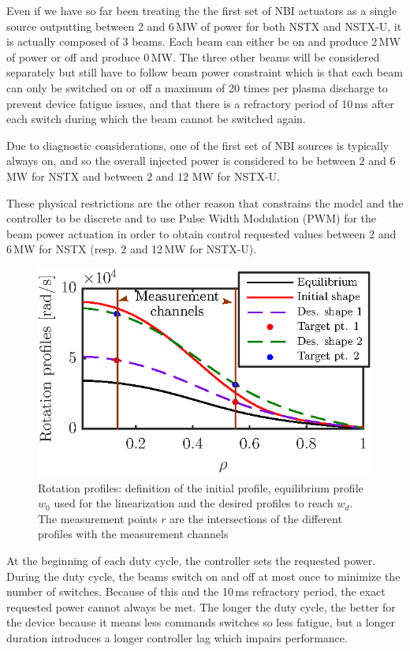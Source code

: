 \documentclass[12pt,lot, lof]{puthesis}
\begin{document}
Even if we have so far been treating the the first set of NBI actuators as a single source outputting between 2 and 6\,MW of power for both NSTX and NSTX-U, it is actually composed of 3 beams. Each beam can either be on and produce 2\,MW of power or off and produce 0\,MW. The three other beams will be considered separately but still have to follow beam power constraint which is that each beam can only be switched on or off a maximum of 20 times per plasma discharge to prevent device fatigue issues, and that there is a refractory period of 10\,ms after each switch during which the beam cannot be switched again.

Due to diagnostic considerations, one of the first set of NBI sources is typically always on, and so the overall injected power is considered to be between $2$ and $6$ MW for NSTX and  between $2$ and $12$ MW for NSTX-U.

These physical restrictions are the other reason that constrains the model and the controller to be discrete and to use Pulse Width Modulation (PWM) for the beam power actuation in order to obtain control requested values between 2 and 6\,MW for NSTX (resp. 2 and 12\,MW for NSTX-U).


\begin{figure}
	\centering
\includegraphics[width=0.7 \linewidth]{fig100}
\caption{Rotation profiles: definition of the initial profile, equilibrium profile $w_0$ used for the linearization and the desired profiles to reach $w_d$. The measurement points $r$ are the intersections of the different profiles with the measurement channels}
\label{go1}
\end{figure}

At the beginning of each duty cycle, the controller sets the requested power. During the duty cycle, the beams switch on and off at most once to minimize the number of switches. Because of this and the 10\,ms refractory period, the exact requested power cannot always be met.
The longer the duty cycle, the better for the device because it means less commands switches so less fatigue, but a longer duration introduces a longer controller lag which impairs performance.
\end{document}
